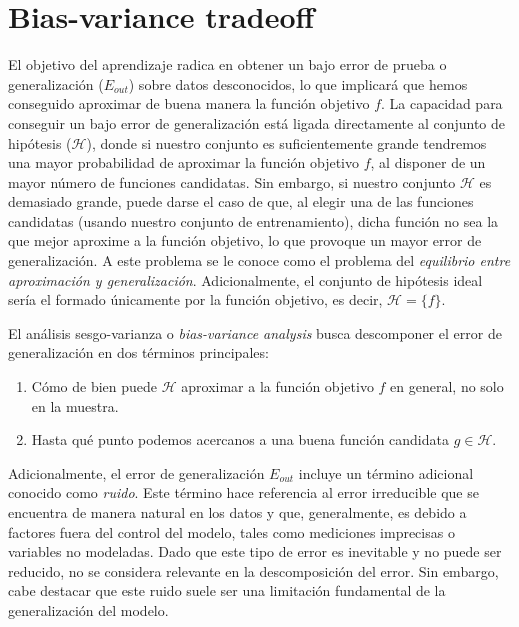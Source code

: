\section{Bias-variance tradeoff}\label{sec:capitulo-bias-variance-tradeoff}
El objetivo del aprendizaje radica en obtener un bajo error de prueba o generalización ($E_{out}$) sobre datos desconocidos, lo que implicará que hemos conseguido aproximar de buena manera la función objetivo $f$. La capacidad para conseguir un bajo error de generalización está ligada directamente al conjunto de hipótesis ($\mathcal{H}$), donde si nuestro conjunto es suficientemente grande tendremos una mayor probabilidad de aproximar la función objetivo $f$, al disponer de un mayor número de funciones candidatas. Sin embargo, si nuestro conjunto $\mathcal{H}$ es demasiado grande, puede darse el caso de que, al elegir una de las funciones candidatas (usando nuestro conjunto de entrenamiento), dicha función no sea la que mejor aproxime a la función objetivo, lo que provoque un mayor error de generalización. A este problema se le conoce como el problema del \textit{equilibrio entre aproximación y generalización}. Adicionalmente, el conjunto de hipótesis ideal sería el formado únicamente por la función objetivo, es decir, $\mathcal{H} = \{f\}$.\newline

El análisis sesgo-varianza o \emph{bias-variance analysis} busca descomponer el error de generalización en dos términos principales:

\begin{enumerate}
    \item Cómo de bien puede $\mathcal{H}$ aproximar a la función objetivo $f$ en general, no solo en la muestra.
    \item Hasta qué punto podemos acercanos a una buena función candidata $g \in \mathcal{H}$.\newline
\end{enumerate}

Adicionalmente, el error de generalización $E_{out}$ incluye un término adicional conocido como \textit{ruido}. Este término hace referencia al error irreducible que se encuentra de manera natural en los datos y que, generalmente, es debido a factores fuera del control del modelo, tales como mediciones imprecisas o variables no modeladas. Dado que este tipo de error es inevitable y no puede ser reducido, no se considera relevante en la descomposición del error. Sin embargo, cabe destacar que este ruido suele ser una limitación fundamental de la generalización del modelo.\newline

